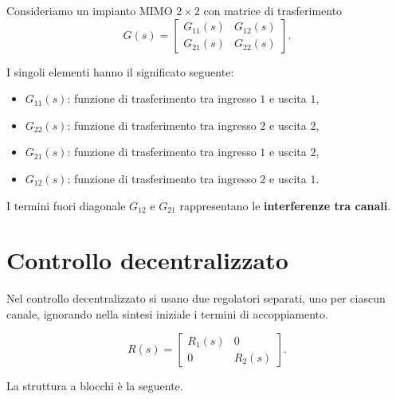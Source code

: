 Consideriamo un impianto MIMO \(2\times 2\) con matrice di trasferimento
\[
G(s)=
\begin{bmatrix}
G_{11}(s) & G_{12}(s)\\
G_{21}(s) & G_{22}(s)
\end{bmatrix}.
\]

I singoli elementi hanno il significato seguente:

\begin{itemize}
    \item \(G_{11}(s)\): funzione di trasferimento tra ingresso \(1\) e uscita \(1\),
    \item \(G_{22}(s)\): funzione di trasferimento tra ingresso \(2\) e uscita \(2\),
    \item \(G_{21}(s)\): funzione di trasferimento tra ingresso \(1\) e uscita \(2\),
    \item \(G_{12}(s)\): funzione di trasferimento tra ingresso \(2\) e uscita \(1\).
\end{itemize}

I termini fuori diagonale \(G_{12}\) e \(G_{21}\) rappresentano le \textbf{interferenze tra canali}.

\section{Controllo decentralizzato}

Nel controllo decentralizzato si usano due regolatori separati, uno per ciascun canale, ignorando nella sintesi iniziale i termini di accoppiamento.

\[
R(s)=
\begin{bmatrix}
R_1(s) & 0\\
0 & R_2(s)
\end{bmatrix}.
\]

La struttura a blocchi è la seguente.

